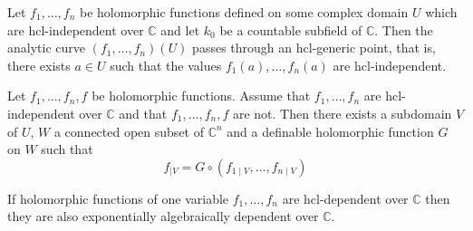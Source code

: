 \documentclass[10pt,a4paper]{amsart}
\begin{document}
\begin{lem} \label{lemma-generic-points}

Let $f_1,\ldots,f_n$ be holomorphic functions defined on some complex domain $U$ which are $\mathrm{hcl}$-independent over $\mathbb{C}$ and let $k_0$ be a countable subfield of $\mathbb{C}$. Then the analytic curve $(f_1,\ldots,f_n)(U)$ passes through an $\mathrm{hcl}$-generic point, that is, there exists $a \in U$ such that the values
$f_1(a),\ldots,f_n(a)$ are $\mathrm{hcl}$-independent.
\end{lem} 

\begin{Prop} \label{prop-from relation to functions}
Let $f_1,\ldots,f_n,f$ be holomorphic functions. Assume that $f_1,\ldots,f_n$ are $\mathrm{hcl}$-independent over $\mathbb{C}$ and that $f_1,\ldots,f_n,f$ are not. Then there exists a subdomain $V$ of $U$, $W$ a connected open subset of $\mathbb{C}^n$ and a definable holomorphic function $G$ on $W$ such that
$$ f_{\mid V} = G \circ (f_{1 \mid V},\ldots,f_{n \mid V}) $$
\end{Prop}

\begin{Prop}\label{o-minimal direction1}
If holomorphic functions of one variable  $f_1,\ldots,f_{n}$ are $\mathrm{hcl}$-dependent over $\mathbb{C}$ then  they are also  exponentially algebraically dependent over $\mathbb{C}$.
\end{Prop} 
\end{document}
